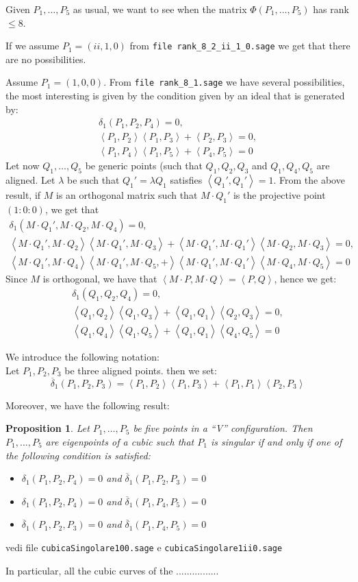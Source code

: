 \documentclass[12pt, a4paper, reqno, captions=tableheading,bibliography=totoc]{scrartcl}
\theoremstyle{plain}
\newtheorem{prop}[lemma]{Proposition}
\theoremstyle{definition}
\newcommand{\scl}[2]{\left\langle {#1}, {#2} \right\rangle}
\begin{document}
Given $P_1, \dots, P_5$ as usual, we want to see when
the matrix $\Phi(P_1, \dots, P_5)$ has rank $\leq 8$.

If we assume $P_1 = (ii, 1, 0)$ from \verb+file rank_8_2_ii_1_0.sage+
we get that there are no possibilities.

Assume $P_1 = (1, 0, 0)$. From \verb+file rank_8_1.sage+ we have several
possibilities, the most interesting is given by the condition given by an
ideal that is generated by:
\begin{gather*}
\delta_1(P_1, P_2, P_4) = 0, \\
\scl{P_1}{P_2}\scl{P_1}{P_3}+\scl{P_2}{P_3} = 0, \\
\scl{P_1}{P_4}\scl{P_1}{P_5}+\scl{P_4}{P_5} = 0
\end{gather*}
Let now $Q_1, \dots, Q_5$ be generic points (such that $Q_1, Q_2, Q_3$
and $Q_1, Q_4, Q_5$ are aligned. Let $\lambda$ be
such that $Q_1' = \lambda Q_1$ satisfies $\scl{Q_1'}{Q_1'} = 1$.
From the above result, if $M$ is an orthogonal matrix such that
$M \cdot Q_1'$ is the projective point $(1: 0: 0)$, we get that 
\begin{gather*}
\delta_1(M\cdot Q_1', M\cdot Q_2, M\cdot Q_4) = 0, \\
\scl{M\cdot Q_1'}{M\cdot Q_2}\scl{M\cdot Q_1'}{M\cdot Q_3}+\scl{M\cdot Q_1'}{M\cdot Q_1'}\scl{M\cdot Q_2}{M\cdot Q_3} = 0, \\
\scl{M\cdot Q_1'}{M\cdot Q_4}\scl{M\cdot Q_1',M\cdot Q_5}+\scl{M\cdot Q_1'}{M\cdot Q_1'}\scl{M\cdot Q_4}{M\cdot Q_5} = 0
\end{gather*}
Since $M$ is orthogonal, we have that $\scl{M\cdot P}{M\cdot Q} = \scl{P}{Q}$,
hence we get:
\begin{gather*}
\delta_1(Q_1, Q_2, Q_4) = 0, \\
\scl{Q_1}{Q_2}\scl{Q_1}{Q_3}+\scl{Q_1}{Q_1}\scl{Q_2}{Q_3} = 0, \\
\scl{Q_1}{Q_4}\scl{Q_1}{Q_5}+\scl{Q_1}{Q_1}\scl{Q_4}{Q_5} = 0
\end{gather*}

We introduce the following notation:\\
Let $P_1, P_2,P_3$ be three aligned points. then we set:
\[
\overline{\delta}_1(P_1, P_2, P_3)  =
\scl{P_1}{P_2}\scl{P_1}{P_3}+\scl{P_1}{P_1}\scl{P_2}{P_3}
\]

Moreover, we have the following result:

\begin{prop}
  Let $P_1, \dots, P_5$ be five points in a ``V'' configuration. Then
  $P_1, \dots, P_5$ are eigenpoints of a cubic such that $P_1$ is singular
  if and only if one of the following condition is satisfied:
  \begin{itemize}
  \item $\delta_1(P_1, P_2, P_4) = 0 $ and $\overline{\delta}_1(P_1, P_2, P_3)=0$
  \item $\delta_1(P_1, P_2, P_4) = 0 $ and $\overline{\delta}_1(P_1, P_4, P_5)=0$
  \item $\overline{\delta}_1(P_1, P_2, P_3)=0$ and
    $\overline{\delta}_1(P_1, P_4, P_5)=0$
  \end{itemize}
\end{prop}
vedi file \verb+cubicaSingolare100.sage+ e \verb+cubicaSingolare1ii0.sage+

In particular, all the cubic curves of the ................
\end{document}
